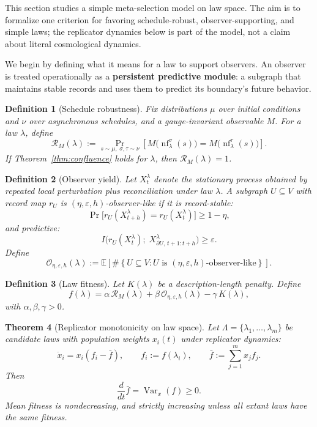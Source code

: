 \documentclass[11pt]{article}
\newtheorem{theorem}{Theorem}[section]
\newtheorem{definition}[theorem]{Definition}
\theoremstyle{remark}
\theoremstyle{plain}
\begin{document}
This section studies a simple meta-selection model on law space. The aim is to formalize one
criterion for favoring schedule-robust, observer-supporting, and simple laws; the replicator
dynamics below is part of the model, not a claim about literal cosmological dynamics.

We begin by defining what it means for a law to support observers. An observer is treated
operationally as a \textbf{persistent predictive module}: a subgraph that maintains stable records
and uses them to predict its boundary's future behavior.

\begin{definition}[Schedule robustness]\label{def:robustness}
Fix distributions $\mu$ over initial conditions and $\nu$ over asynchronous schedules, and a gauge-invariant observable $M$. For a law $\lambda$, define
\[
\mathcal{R}_M(\lambda)
:=
\Pr_{s\sim\mu,\;\sigma,\tau\sim\nu}
\!\left[
M\bigl(\operatorname{nf}^{\sigma}_\lambda(s)\bigr)
=
M\bigl(\operatorname{nf}^{\tau}_\lambda(s)\bigr)
\right].
\]
If Theorem~\ref{thm:confluence} holds for $\lambda$, then $\mathcal{R}_M(\lambda)=1$.
\end{definition}

\begin{definition}[Observer yield]\label{def:yield}
Let $X_t^\lambda$ denote the stationary process obtained by repeated local perturbation plus reconciliation under law $\lambda$. A subgraph $U\subseteq V$ with record map $r_U$ is $(\eta,\varepsilon,h)$-observer-like if it is record-stable:
\[
\Pr\bigl[r_U(X_{t+h}^\lambda)=r_U(X_t^\lambda)\bigr]\ge 1-\eta,
\]
and predictive:
\[
I\bigl(r_U(X_t^\lambda);\; X_{\partial U,\,t+1:t+h}^\lambda\bigr)\ge\varepsilon.
\]
Define
\[
\mathcal{O}_{\eta,\varepsilon,h}(\lambda)
:=
\mathbb{E}\!\left[
\#\left\{
U\subseteq V:
U \text{ is } (\eta,\varepsilon,h)\text{-observer-like}
\right\}
\right].
\]
\end{definition}

\begin{definition}[Law fitness]\label{def:fitness}
Let $K(\lambda)$ be a description-length penalty. Define
\[
f(\lambda) = \alpha\,\mathcal{R}_M(\lambda) + \beta\,\mathcal{O}_{\eta,\varepsilon,h}(\lambda) - \gamma\,K(\lambda),
\]
with $\alpha,\beta,\gamma>0$.
\end{definition}

\begin{theorem}[Replicator monotonicity on law space]\label{thm:replicator}
Let $\Lambda=\{\lambda_1,\dots,\lambda_m\}$ be candidate laws with population weights $x_i(t)$ under replicator dynamics:
\[
\dot{x}_i = x_i(f_i - \bar{f}),
\qquad
f_i := f(\lambda_i),
\qquad
\bar{f} := \sum_{j=1}^m x_j f_j.
\]
Then
\[
\frac{d}{dt}\bar{f} = \operatorname{Var}_x(f) \ge 0.
\]
Mean fitness is nondecreasing, and strictly increasing unless all extant laws have the same fitness.
\end{theorem}
\end{document}
